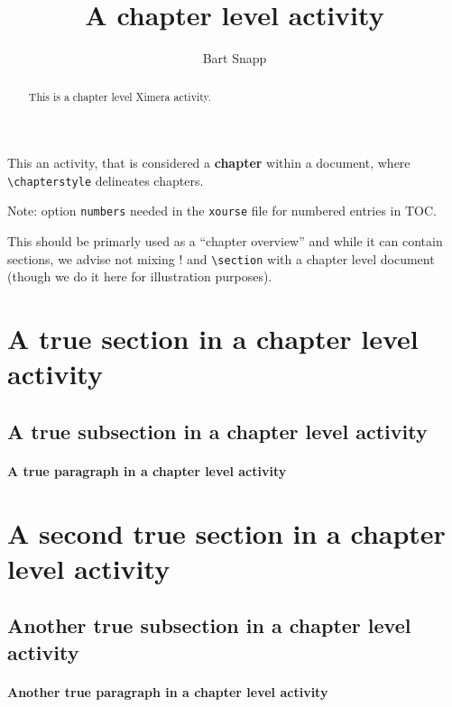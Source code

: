 \documentclass{ximera}
\author{Bart Snapp}
\title{A chapter level activity}
\begin{document}
\begin{abstract}
This is a chapter level Ximera activity.
\end{abstract}
\maketitle

This an activity, that is considered a
\textbf{chapter} within a document, where \verb!\chapterstyle! delineates
chapters.

Note: option \verb!numbers! needed in the \verb!xourse! file for numbered entries in TOC.


This should be primarly used as a ``chapter overview'' and while it can contain
sections, we advise not mixing \verb!!\sectionstyle! and \verb!\section! with a
chapter level document (though we do it here for illustration purposes).

\section{A true section in a chapter level activity}
\lipsum[1][1-2]

\subsection{A true subsection in a chapter level activity}
\lipsum[2][1-2]

\paragraph{A true paragraph in a chapter level activity}
\lipsum[3][1]

\section{A second true section in a chapter level activity}
\lipsum[1][1-2]

\subsection{Another true subsection in a chapter level activity}
\lipsum[2][1-2]

\paragraph{Another true paragraph in a chapter level activity}
\lipsum[3][1]
\end{document}
